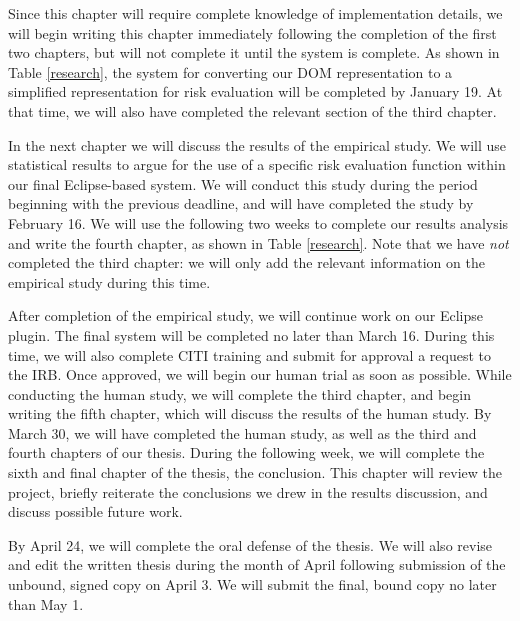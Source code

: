 \documentclass[11pt]{article}
\begin{document}
Since this chapter will require complete knowledge of implementation
details, we will begin writing this chapter immediately following
the completion of the first two chapters, but will not complete it
until the system is complete.  As shown in Table \ref{research}, the
system for converting our DOM representation to a simplified representation
for risk evaluation will be completed by January 19.  At that time,
we will also have completed the relevant section of the third chapter.

In the next chapter we will discuss the results of the empirical study.
We will use statistical results to argue for the use of a specific
risk evaluation function within our final Eclipse-based system.  We 
will conduct this study during the period beginning with the previous
deadline, and will have completed the study by February 16.  We will use
the following two weeks to complete our results analysis and write the
fourth chapter, as shown in Table \ref{research}.  Note that we have
\textit{not} completed the third chapter: we will only add the relevant
information on the empirical study during this time.

After completion of the empirical study, we will continue work on our
Eclipse plugin.  The final system will be completed no later than March 16.
During this time, we will also complete CITI training and submit for
approval a request to the IRB.  Once approved, we will begin our human 
trial as soon as possible.  While conducting the human study, we will
complete the third chapter, and begin writing the fifth chapter, which 
will discuss the results of the human study.  By March 30, we will have
completed the human study, as well as the third and fourth chapters of
our thesis.  During the following week, we will complete the sixth and
final chapter of the thesis, the conclusion.  This chapter will review
the project, briefly reiterate the conclusions we drew in the results
discussion, and discuss possible future work.

By April 24, we will complete the oral defense of the thesis.  We will
also revise and edit the written thesis during the month of April following
submission of the unbound, signed copy on April 3.  We will submit the
final, bound copy no later than May 1.
\end{document}
